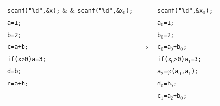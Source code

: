 \documentclass{jarticle}
\begin{document}
\begin{tabular}{lcl}
    \verb|scanf("%d",&x);| &               & \verb|scanf("%d",&x|$_0$\verb|);|                             \\
    \verb|a=1;|            &               & \verb|a|$_0$\verb|=1;|                                        \\
    \verb|b=2;|            &               & \verb|b|$_0$\verb|=2;|                                        \\
    \verb|c=a+b;|          & $\Rightarrow$ & \verb|c|$_0$\verb|=a|$_0$\verb|+b|$_0$\verb|;|                \\
    \verb|if(x>0)a=3;|     &               & \verb|if(x|$_0$\verb|>0)a|$_1$\verb|=3;|                      \\
    \verb|d=b;|            &               & \verb|a|$_2$\verb|=|$\varphi$\verb|(a|$_0$\verb|,a|$_1$\verb|);| \\
    \verb|c=a+b;|          &               & \verb|d|$_0$\verb|=b|$_0$\verb|;|                             \\
                           &               & \verb|c|$_1$\verb|=a|$_2$\verb|+b|$_0$\verb|;|                \\
\end{tabular}
\end{document}
